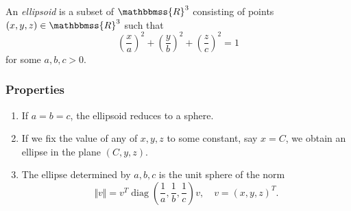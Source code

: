 \documentclass[12pt]{article}
\newcommand{\R}{\mathbbmss{R}}
\begin{document}
An \emph{ellipsoid} is a subset of $\R^3$ consisting of points
$(x,y,z)\in \R^3$ such that 
$$
   \left(\frac{x}{a}\right)^2+   \left(\frac{y}{b}\right)^2+   \left(\frac{z}{c}\right)^2=1
$$
for some $a,b,c>0$.

\subsubsection*{Properties}
\begin{enumerate}
\item If $a=b=c$, the ellipsoid reduces to a sphere.
\item If we fix the value of any of $x,y,z$ to some constant, say $x=C$, 
   we obtain an ellipse in the plane $(C,y,z)$. 
\item The ellipse determined by $a,b,c$ is the unit sphere of the 
   norm
$$
    \Vert v \Vert = v^T \operatorname{diag} (\frac{1}{a}, \frac{1}{b}, \frac{1}{c}) v, \quad v=(x,y,z)^T.
$$
\end{enumerate}
\end{document}
